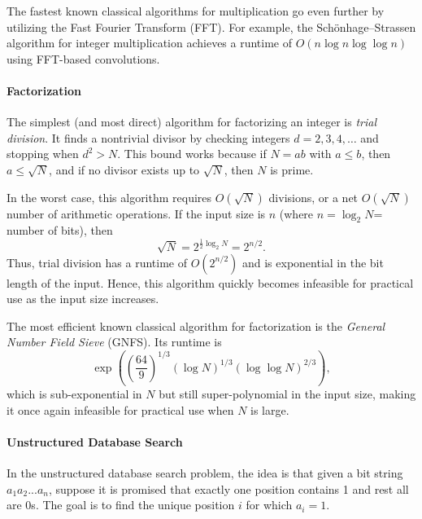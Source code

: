 The fastest known classical algorithms for multiplication go even further by utilizing the Fast Fourier Transform (FFT). For example, the Schönhage--Strassen algorithm for integer multiplication achieves a runtime of \(O(n \log n \log \log n)\) using FFT-based convolutions.

\paragraph{Factorization}
The simplest (and most direct) algorithm for factorizing an integer is \emph{trial division}. It finds a nontrivial divisor by checking integers $d = 2, 3, 4, \ldots$ and stopping when $d^2 > N$. This bound works because if $N = ab$ with $a \le b$, then $a \le \sqrt{N}$, and if no divisor exists up to $\sqrt{N}$, then $N$ is prime.

In the worst case, this algorithm requires $O(\sqrt{N})$ divisions, or a net $O(\sqrt{N})$ number of arithmetic operations. If the input size is $n$ (where $n = \log_2 N$= number of bits), then
\[
\sqrt{N} = 2^{\frac{1}{2} \log_2 N} = 2^{n/2}.
\]
Thus, trial division has a runtime of $O(2^{n/2})$ and is exponential in the bit length of the input. Hence, this algorithm quickly becomes infeasible for practical use as the input size increases.

The most efficient known classical algorithm for factorization is the \emph{General Number Field Sieve} (GNFS). Its runtime is
\[
\exp\!\left( \left( \frac{64}{9} \right)^{1/3} (\log N)^{1/3} (\log \log N)^{2/3} \right),
\]
which is sub-exponential in $N$ but still super-polynomial in the input size, making it once again infeasible for practical use when $N$ is large.

\medskip
\noindent
{}
\medskip

\paragraph{Unstructured Database Search}
In the unstructured database search problem, the idea is that given a bit string $a_1a_2...a_n$, suppose it is promised that exactly one position contains 1 and rest all are 0s. The goal is to find the unique position \( i \) for which \( a_i = 1 \).

